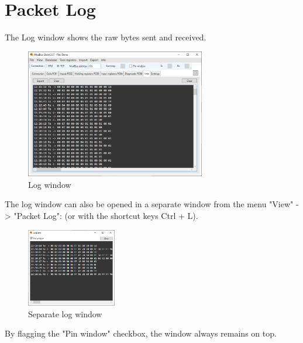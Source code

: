 
\chapter{Packet Log}

The Log window shows the raw bytes sent and received.

\begin{figure}[H]
\centering
\includegraphics[width=0.70\textwidth]{../Img/ModBus_Client_Log_00.PNG}
\caption{Log window}
\end{figure}

The log window can also be opened in a separate window from the menu "View" -> "Packet Log":
(or with the shortcut keys Ctrl + L).

\begin{figure}[H]
\centering
\includegraphics[width=0.35\textwidth]{../Img/ModBus_Client_Log_01.PNG}
\caption{Separate log window}
\end{figure}

By flagging the "Pin window" checkbox, the window always 
remains on top.